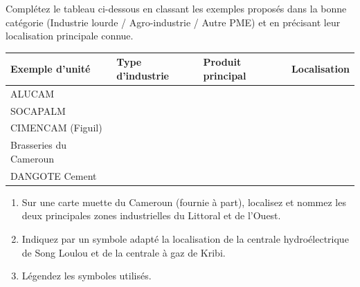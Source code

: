 \documentclass[11pt]{article}
\begin{document}
\begin{exercice}
Complétez le tableau ci-dessous en classant les exemples proposés dans la bonne catégorie (Industrie lourde / Agro-industrie / Autre PME) et en précisant leur localisation principale connue.

\begin{tabular}{|p{3.5cm}|p{3cm}|p{3.5cm}|p{3.5cm}|}
\hline
\textbf{Exemple d'unité} & \textbf{Type d'industrie} & \textbf{Produit principal} & \textbf{Localisation} \\
\hline
ALUCAM & & & \\
\hline
SOCAPALM & & & \\
\hline
CIMENCAM (Figuil) & & & \\
\hline
Brasseries du Cameroun & & & \\
\hline
DANGOTE Cement & & & \\
\hline
\end{tabular}
\end{exercice}

\begin{exercice}
\begin{enumerate}
    \item Sur une carte muette du Cameroun (fournie à part), localisez et nommez les deux principales zones industrielles du Littoral et de l'Ouest.
    \item Indiquez par un symbole adapté la localisation de la centrale hydroélectrique de Song Loulou et de la centrale à gaz de Kribi.
    \item Légendez les symboles utilisés.
\end{enumerate}
\end{exercice}
\end{document}
